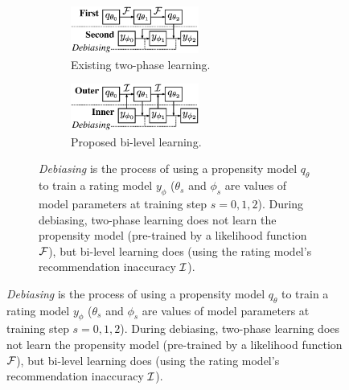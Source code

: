 \documentclass[letterpaper]{article} %
\newcommand{\likelihood}[1]{\mathcal{F}_{\rm #1}}
\newcommand{\inaccuracy}[1]{\mathcal{I}_{\rm #1}}
\newcommand{\ratingName}{y}
\newcommand{\ratingParam}{\phi}
\newcommand{\propensityName}{q}
\newcommand{\propensityParam}{\theta}
\newcommand{\step}{s}
\begin{document}
\begin{figure}[!t]
\hspace*{-0.44cm}
\begin{minipage}[t]{1.090\linewidth}
\centering
\begin{figure}[H]
\centering
\begin{subfigure}{0.495\textwidth}
  \centering
  \includegraphics[width=4.2cm]{fig/two_phase.eps}
  \caption{Existing two-phase learning.}
  \label{fig:two phase}
\end{subfigure}
\hfill
\begin{subfigure}{0.495\textwidth}
  \centering
  \includegraphics[width=4.2cm]{fig/bi_level.eps}
  \caption{Proposed bi-level learning.}
  \label{fig:bi level}
\end{subfigure}
\caption{
  \emph{Debiasing} is the process of using a propensity model $\propensityName_\propensityParam$ to train a rating model $\ratingName_\ratingParam$ ($\propensityParam_\step$ and $\ratingParam_\step$ are values of model parameters at training step $\step=0,1,2$).
  During debiasing, two-phase learning does not learn the propensity model (pre-trained by a likelihood function $\likelihood{}$), but bi-level learning does (using the rating model's recommendation inaccuracy $\inaccuracy{}$).
}
\end{figure}%
\end{minipage}
\end{figure}
\end{document}
